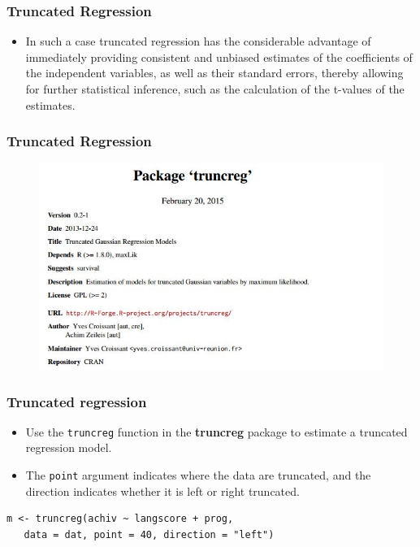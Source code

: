 \documentclass{beamer}
\begin{document}
\begin{frame}
	\frametitle{Truncated Regression}
	\large
	\begin{itemize}
		\item 
		In such a case truncated regression has the considerable advantage of immediately providing consistent and unbiased estimates of the coefficients of the independent variables, as well as their standard errors, thereby allowing for further statistical inference, such as the calculation of the t-values of the estimates.
	\end{itemize}
\end{frame}
\begin{frame}
	\frametitle{Truncated Regression}
	\large
	\begin{figure}
		\centering
		\includegraphics[width=1.1\linewidth]{images/CRAN-truncreg}
		\caption{}
		\label{fig:CRAN-truncreg}
	\end{figure}
	
\end{frame}
\begin{frame}[fragile]
\frametitle{Truncated regression}
\large
\begin{itemize}
\item Use the \texttt{truncreg} function in the \textbf{truncreg} package to estimate a truncated regression model. 
\item The \texttt{point} argument indicates where the data are truncated, and the direction indicates whether it is left or right truncated.

\end{itemize}

\begin{framed}
\begin{verbatim}
m <- truncreg(achiv ~ langscore + prog, 
   data = dat, point = 40, direction = "left")
\end{verbatim}
\end{framed}

\end{frame}
\end{document}
